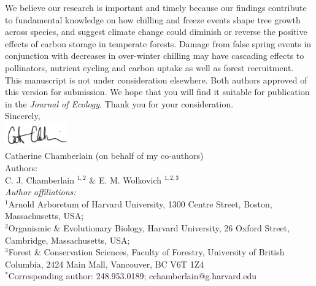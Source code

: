 \documentclass[11pt,a4paper]{article}\usepackage[]{graphicx}\usepackage[]{color}
\begin{document}
\noindent We believe our research is important and timely because our findings contribute to fundamental knowledge on how chilling and freeze events shape tree growth across species, and suggest climate change could diminish or reverse the positive effects of carbon storage in temperate forests. Damage from false spring events in conjunction with decreases in over-winter chilling may have cascading effects to pollinators, nutrient cycling and carbon uptake as well as forest recruitment. \\ 

\noindent This manuscript is not under consideration elsewhere. Both authors approved of this version for submission. We hope that you will find it suitable for publication in the \textit{Journal of Ecology}. Thank you for your consideration. \\

\vspace{1.5ex}
\noindent Sincerely, \\
\includegraphics[width=0.2\textwidth]{full_signature.jpg} \\
\noindent Catherine Chamberlain (on behalf of my co-authors)
\vspace{2ex}\\
\noindent Authors:\\
C. J. Chamberlain $^{1,2}$ \& E. M. Wolkovich $^{1,2,3}$
\vspace{2ex}\\
\emph{Author affiliations:}\\
$^{1}$Arnold Arboretum of Harvard University, 1300 Centre Street, Boston, Massachusetts, USA; \\
$^{2}$Organismic \& Evolutionary Biology, Harvard University, 26 Oxford Street, Cambridge, Massachusetts, USA; \\
$^{3}$Forest \& Conservation Sciences, Faculty of Forestry, University of British Columbia, 2424 Main Mall, Vancouver, BC V6T 1Z4\\
\vspace{2ex}
$^*$Corresponding author: 248.953.0189; cchamberlain@g.harvard.edu\\


\end{document}
